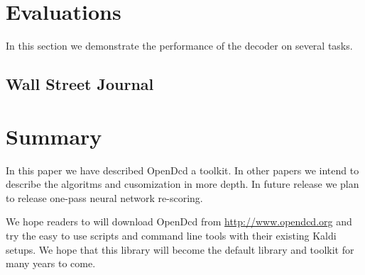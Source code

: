 \documentclass{article}
\begin{document}
\section{Evaluations}
\label{sec:majhead}
In this section we demonstrate the performance of the decoder on several 
tasks.

\subsection{Wall Street Journal}

\section{Summary}
\label{sec:page}
In this paper we have described OpenDcd a toolkit. In other papers we intend to
describe the algoritms and cusomization in more depth. In future release we
plan to release one-pass neural network re-scoring.

We hope readers to will download OpenDcd from  \url{http://www.opendcd.org} and
try the easy to use scripts and command line tools with their existing Kaldi setups.
We hope that this library will become the default library and toolkit for many 
years to come.



\end{document}

